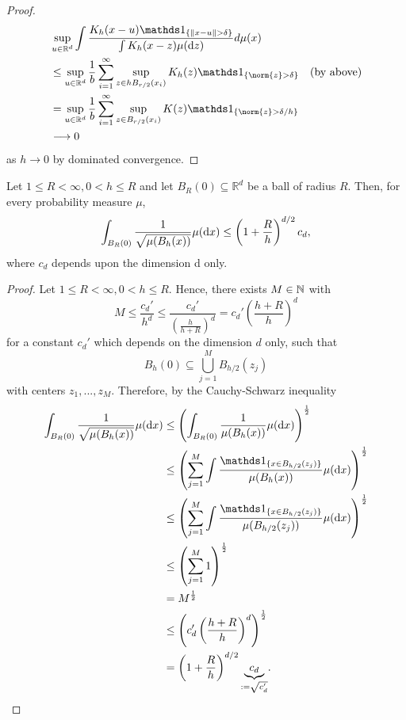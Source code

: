 \begin{proof}
    \begin{align*}
        & \sup\limits_{u \in \mathbb{R}^d} \int \frac{K_h(x-u) \ind{\{ \| x-u \| > \delta \} }}{\int K_h(x-z) \mu(\diff{z})} d \mu (x) \\
        &\leq \sup\limits_{u \in \mathbb{R}^d} \frac{1}{b} \sum_{i=1}^\infty \sup_{z\in hB_{r/2}(x_i)} K_h(z) \ind{\{ \norm{z} > \delta \}} \quad \text{(by above)} \\
        &= \sup\limits_{u \in \mathbb{R}^d} \frac{1}{b} \sum_{i=1}^\infty \sup_{z\in B_{r/2}(x_i)} K(z) \ind{\{ \norm{z} > \delta/h \}} \\
        &\longrightarrow 0
    \end{align*}
    as $h \rightarrow 0$ by dominated convergence.
\end{proof}

\begin{lemma} \label{lemma23.7}
Let $1 \leq R < \infty, 0<h \leq R$ and let $B_R(0) \subseteq \mathbb{R}^d$ be a ball of radius $R$. Then, for every probability measure $\mu$, 
\[\int_{B_R(0)} \frac{1}{\sqrt{\mu(B_h(x))}} \mu(\diff{x}) \leq \left(1+\frac{R}{h}\right)^{d/2} c_d,\]
where $c_d$ depends upon the dimension d only.
\end{lemma}
\begin{proof}
    Let $1 \leq R < \infty, 0<h \leq R$. Hence, there exists $M \in \mathbb{N}$ with
    \[
        M \leq \frac{c_d'}{h^d} \leq \frac{c_d'}{\left( \frac{h}{h+R} \right)^d} = c_d' \left( \frac{h+R}{h} \right)^d
    \] for a constant $c_d'$ which depends on the dimension $d$ only, such that
    \[B_h(0) \subseteq \bigcup_{j=1}^{M} B_{h/2}(z_j)\]
    with centers $z_1,...,z_{M}$. Therefore, by the Cauchy-Schwarz inequality
    \begin{align*}
        \int_{B_R(0)} \frac{1}{\sqrt{\mu(B_h(x))}} \mu(\diff{x})
        &\leq \left( \int_{B_R(0)} \frac{1}{\mu(B_h(x))} \mu(\diff{x}) \right)^\frac{1}{2} \\
        &\leq \left( \sum_{j=1}^{M} \int \frac{\ind{\{x \in B_{h/2}(z_j)\}}}{\mu(B_h(x))} \mu(\diff{x}) \right)^\frac{1}{2} \\
        &\leq \left( \sum_{j=1}^{M} \int \frac{\ind{\{x \in B_{h/2}(z_j)\}}}{\mu(B_{h/2}(z_j))} \mu(\diff{x}) \right)^\frac{1}{2} \\
        &\leq \left( \sum_{j=1}^{M} 1 \right)^\frac{1}{2} \\
        &= M^\frac{1}{2} \\
        &\leq \left( c_d' \left( \frac{h+R}{h} \right)^d \right)^\frac{1}{2} \\
        &= \left(1+\frac{R}{h}\right)^{d/2} \underset{:= \sqrt{c_d'}}{\underbrace{c_d}}.
    \end{align*}
\end{proof}

